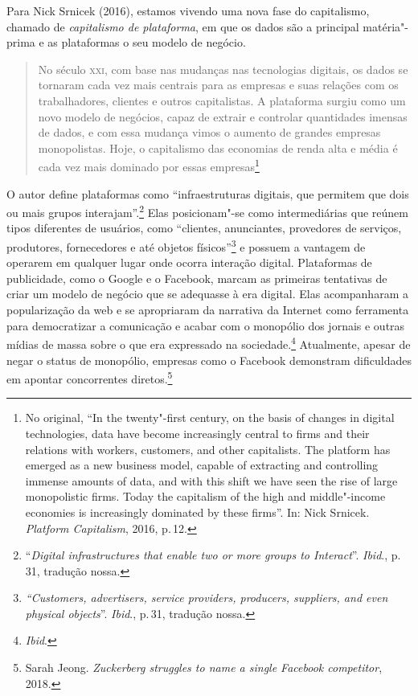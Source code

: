 Para Nick Srnicek (2016), estamos vivendo uma nova fase do capitalismo,
chamado de \textit{capitalismo de plataforma}, em que os dados são a
principal matéria"-prima e as plataformas o seu modelo de negócio.

\begin{quote}
No século \textsc{xxi}, com base nas mudanças nas tecnologias digitais, os dados
se tornaram cada vez mais centrais para as empresas e suas relações com
os trabalhadores, clientes e outros capitalistas. A plataforma surgiu
como um novo modelo de negócios, capaz de extrair e controlar
quantidades imensas de dados, e com essa mudança vimos o aumento de
grandes empresas monopolistas. Hoje, o capitalismo das economias de
renda alta e média é cada vez mais dominado por essas empresas\footnote{No original, ``In
  the twenty"-first century, on the basis of changes in digital
  technologies, data have become increasingly central to firms and their
  relations with workers, customers, and other capitalists. The platform
  has emerged as a new business model, capable of extracting and
  controlling immense amounts of data, and with this shift we have seen
  the rise of large monopolistic firms. Today the capitalism of the high
  and middle"-income economies is increasingly dominated by these
  firms''. In: Nick Srnicek. \textit{Platform Capitalism}, 2016, p.\,12.}
\end{quote}

O autor define plataformas como ``infraestruturas digitais, que permitem
que dois ou mais grupos interajam''.\footnote{``\textit{Digital infrastructures
  that enable two or more groups to Interact}''. \textit{Ibid}., p.\,31, tradução
nossa.} Elas posicionam"-se como intermediárias que reúnem tipos
diferentes de usuários, como ``clientes, anunciantes, provedores de
serviços, produtores, fornecedores e até objetos físicos''\footnote{\textit{``Customers,
  advertisers, service providers, producers, suppliers, and even
  physical objects}''. \textit{Ibid}., p.\,31, tradução nossa.} e possuem a vantagem
de operarem em qualquer lugar onde ocorra interação digital. Plataformas
de publicidade, como o Google e o Facebook, marcam as primeiras
tentativas de criar um modelo de negócio que se adequasse à era digital.
Elas acompanharam a popularização da web e se apropriaram da narrativa
da Internet como ferramenta para democratizar a comunicação e acabar com
o monopólio dos jornais e outras mídias de massa sobre o que era
expressado na sociedade.\footnote{\textit{Ibid}.} Atualmente, apesar de negar o
status de monopólio, empresas como o Facebook demonstram dificuldades em
apontar concorrentes diretos.\footnote{Sarah Jeong. \textit{Zuckerberg struggles to name a single Facebook competitor}, 2018.}

